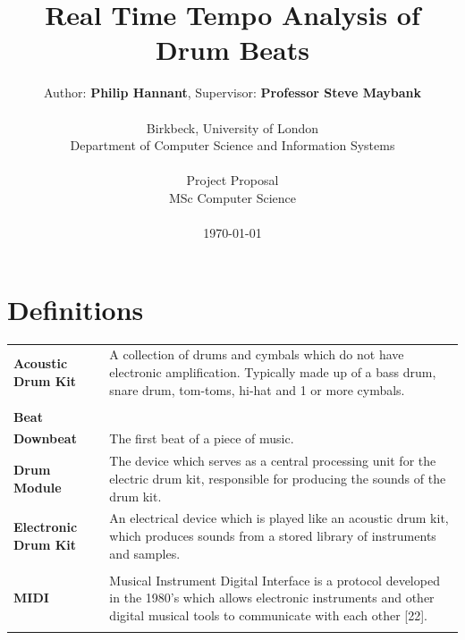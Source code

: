 \documentclass[a4paper, 11pt]{article}
\date{}
\begin{document}
 

\LARGE\title{Real Time Tempo Analysis of Drum Beats}

\LARGE\author{Author: \textbf{Philip Hannant}, Supervisor: \textbf{Professor Steve Maybank}\\
\\Birkbeck, University of London\\
Department of Computer Science and Information Systems\\
\\Project Proposal\\
MSc Computer Science\\
\\\monthyeardate\today
}





\normalsize


\maketitle
\newpage
\tableofcontents
\clearpage

\section*{Definitions}
\begin{tabular}{l p{4.5in}  }
\textbf{Acoustic Drum Kit} & A collection of drums and cymbals which do not have electronic amplification. Typically made up of a bass drum, snare drum, tom-toms, hi-hat and 1 or more cymbals.\\\\
\textbf{Beat} & \\
\textbf{Downbeat} & The first beat of a piece of music.\\
\textbf{Drum Module} & The device which serves as a central processing unit for the electric drum kit, responsible for producing the sounds of the drum kit.\\
\textbf{Electronic Drum Kit} & An electrical device which is played like an acoustic drum kit, which produces sounds from a stored library of instruments and samples.\\\\
\textbf{MIDI} & Musical Instrument Digital Interface is a protocol developed in the 1980's which allows electronic instruments and other digital musical tools to communicate with each other [22].\\\\
\end{tabular}
\clearpage
\end{document}

